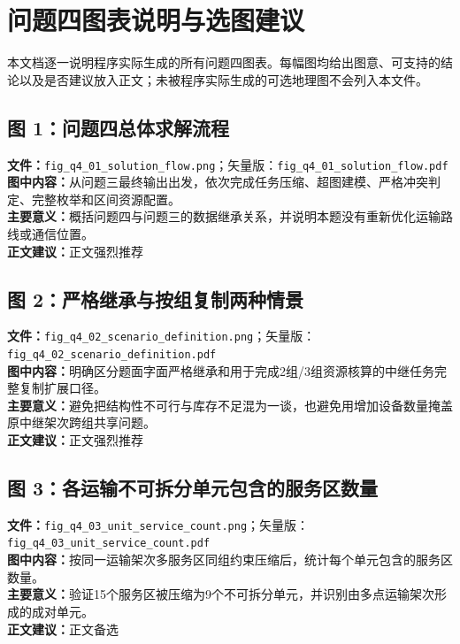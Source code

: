 \section*{问题四图表说明与选图建议}
本文档逐一说明程序实际生成的所有问题四图表。每幅图均给出图意、可支持的结论以及是否建议放入正文；未被程序实际生成的可选地理图不会列入本文件。

\subsection*{图 1：问题四总体求解流程}
\textbf{文件：}\texttt{fig\_q4\_01\_solution\_flow.png}；矢量版：\texttt{fig\_q4\_01\_solution\_flow.pdf}\\
\textbf{图中内容：}从问题三最终输出出发，依次完成任务压缩、超图建模、严格冲突判定、完整枚举和区间资源配置。\\
\textbf{主要意义：}概括问题四与问题三的数据继承关系，并说明本题没有重新优化运输路线或通信位置。\\
\textbf{正文建议：}正文强烈推荐

\subsection*{图 2：严格继承与按组复制两种情景}
\textbf{文件：}\texttt{fig\_q4\_02\_scenario\_definition.png}；矢量版：\texttt{fig\_q4\_02\_scenario\_definition.pdf}\\
\textbf{图中内容：}明确区分题面字面严格继承和用于完成2组/3组资源核算的中继任务完整复制扩展口径。\\
\textbf{主要意义：}避免把结构性不可行与库存不足混为一谈，也避免用增加设备数量掩盖原中继架次跨组共享问题。\\
\textbf{正文建议：}正文强烈推荐

\subsection*{图 3：各运输不可拆分单元包含的服务区数量}
\textbf{文件：}\texttt{fig\_q4\_03\_unit\_service\_count.png}；矢量版：\texttt{fig\_q4\_03\_unit\_service\_count.pdf}\\
\textbf{图中内容：}按同一运输架次多服务区同组约束压缩后，统计每个单元包含的服务区数量。\\
\textbf{主要意义：}验证15个服务区被压缩为9个不可拆分单元，并识别由多点运输架次形成的成对单元。\\
\textbf{正文建议：}正文备选

